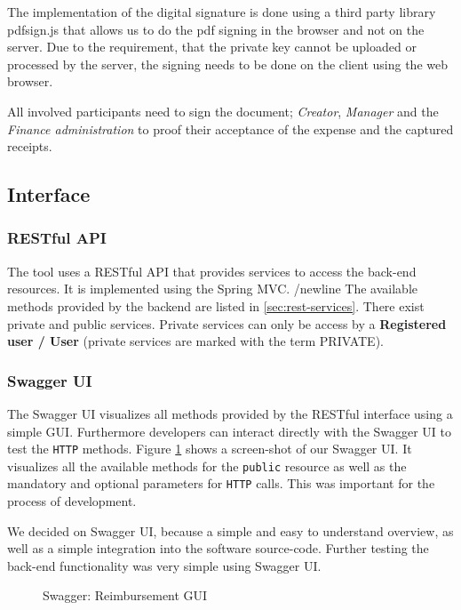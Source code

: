The implementation of the digital signature is done using a third party library pdfsign.js \cite{pdfsign} that allows us to do the pdf signing in the browser and not on the server. Due to the requirement, that the private key cannot be uploaded or processed by the server, the signing needs to be done on the client using the web browser.\par

All involved participants need to sign the document; \textit{Creator}, \textit{Manager} and the \textit{Finance administration} to proof their acceptance of the expense and the captured receipts. \par

\subsection{Interface}

\subsubsection{RESTful API}
\label{sec:restfulapi}
The tool uses a RESTful API that provides services to access the back-end resources. It is implemented using the Spring MVC. /newline
The available methods provided by the backend are listed in \ref{sec:rest-services}. There exist private and public services. Private services can only be access by a \textbf{Registered user / User} (private services are marked with the term PRIVATE).

\subsubsection{Swagger UI}
The Swagger UI visualizes all methods provided by the RESTful interface using a simple GUI. Furthermore developers can interact directly with the Swagger UI to test the \texttt{HTTP} methods. Figure \ref{fig:swagger01} shows a screen-shot of our Swagger UI. It visualizes all the available methods for the \texttt{public} resource as well as the mandatory and optional parameters for \texttt{HTTP} calls. This was important for the process of development. \cite{swagger} \par
We decided on Swagger UI, because a simple and easy to understand overview, as well as a simple integration into the software source-code. Further testing the back-end functionality was very simple using Swagger UI.

\begin{figure}[H]
    \centering
    \caption{Swagger: Reimbursement GUI}
    \label{fig:swagger01}
\end{figure}

